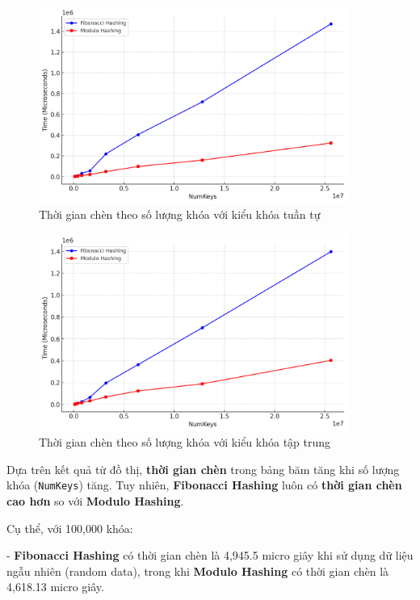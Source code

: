 \documentclass[12pt,a4paper]{report}
\begin{document}
\begin{figure}[!ht]
    \centering
    \includegraphics[width=0.9\textwidth]{insert_seq.png}
    \caption{Thời gian chèn theo số lượng khóa với kiểu khóa tuần tự}
    \label{fig:insert_seq}
\end{figure}

\begin{figure}[!ht]
    \centering
    \includegraphics[width=0.9\textwidth]{insert_clus.png}
    \caption{Thời gian chèn theo số lượng khóa với kiểu khóa tập trung}
    \label{fig:insert_clus}
\end{figure}
\noindent \indent Dựa trên kết quả từ đồ thị, \textbf{thời gian chèn} trong bảng băm tăng khi số lượng khóa (\texttt{NumKeys}) tăng. Tuy nhiên, \textbf{Fibonacci Hashing} luôn có \textbf{thời gian chèn cao hơn} so với \textbf{Modulo Hashing}.

Cụ thể, với 100,000 khóa:

    - \textbf{Fibonacci Hashing} có thời gian chèn là 4,945.5 micro giây khi sử dụng dữ liệu ngẫu nhiên (random data), trong khi \textbf{Modulo Hashing} có thời gian chèn là 4,618.13 micro giây.
    
\end{document}
